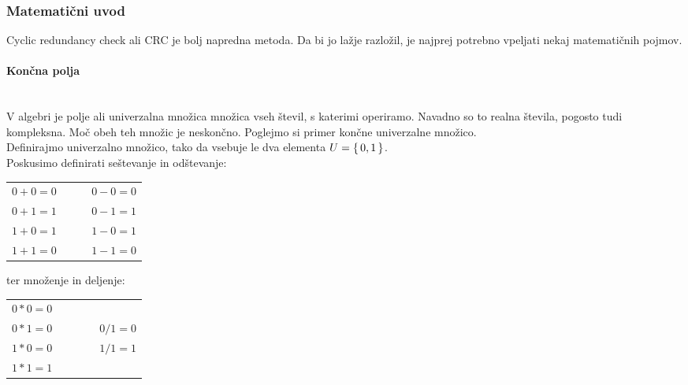 \documentclass[12pt]{article}
\begin{document}
        \subsubsection{Matematični uvod}
            Cyclic redundancy check ali CRC je bolj napredna metoda. Da bi jo 
            lažje razložil, je najprej potrebno vpeljati nekaj matematičnih 
            pojmov.
            \paragraph{Končna polja} \label{sec:polja} \mbox{}\\
                V algebri je polje ali univerzalna množica množica vseh števil,
                s katerimi operiramo. Navadno so to realna števila, pogosto tudi
                kompleksna. Moč obeh teh množic je neskončno. Poglejmo si primer
                končne univerzalne množico. \\
                Definirajmo univerzalno množico, tako 
                da vsebuje le dva elementa $U = \set{0, 1}$.\\
                Poskusimo definirati seštevanje in odštevanje:
                \begin{table}[h!]
                    \centering
                    \begin{tabular}{l p{0.2\linewidth}}
                        $0 + 0 = 0$  & $0 - 0 = 0$ \\
                        $0 + 1 = 1$  & $0 - 1 = 1$ \\
                        $1 + 0 = 1$  & $1 - 0 = 1$ \\
                        $1 + 1 = 0$  & $1 - 1 = 0$ \\
                    \end{tabular}
                \end{table}

                ter množenje in deljenje:
                \begin{table}[h!]
                    \centering
                    \begin{tabular}{l p{0.2\linewidth}}
                        $0 * 0 = 0$  &  \\
                        $0 * 1 = 0$  & $0 / 1 = 0$\\
                        $1 * 0 = 0$  & $1 / 1 = 1$\\
                        $1 * 1 = 1$  &  \\
                    \end{tabular}
                \end{table}
\end{document}
